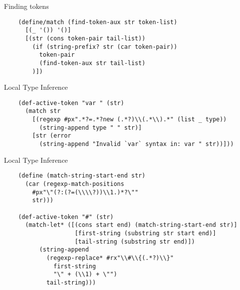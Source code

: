 \documentclass[13pt]{beamer}
\begin{document}
\begin{frame}[fragile]{Finding tokens}
  \begin{verbatim}
    (define/match (find-token-aux str token-list)
      [(_ '()) '()]
      [(str (cons token-pair tail-list))
        (if (string-prefix? str (car token-pair))
          token-pair
          (find-token-aux str tail-list)
        )])
 \end{verbatim}
\end{frame}


\begin{frame}[fragile]{Local Type Inference}
  \note{
    
  }
  \begin{verbatim}
    (def-active-token "var " (str) 
      (match str
        [(regexp #px".*?=.*?new (.*?)\\(.*\\).*" (list _ type))
          (string-append type " " str)]
        [str (error
          (string-append "Invalid `var` syntax in: var " str))]))
 \end{verbatim}
\end{frame}


\begin{frame}[fragile]{Local Type Inference}
  \note{
    
  }
  \begin{verbatim}
    (define (match-string-start-end str)
      (car (regexp-match-positions
        #px"\"(?:(?=(\\\\?))\\1.)*?\""
        str)))

    (def-active-token "#" (str)
      (match-let* ([(cons start end) (match-string-start-end str)]
                    [first-string (substring str start end)]
                    [tail-string (substring str end)])
          (string-append 
            (regexp-replace* #rx"\\#\\{(.*?)\\}"
              first-string
              "\" + (\\1) + \"")
            tail-string)))

 \end{verbatim}
\end{frame}
\end{document}
